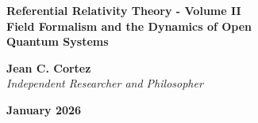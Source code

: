 \documentclass[10pt, a4paper]{article}
\begin{document}
\begin{titlepage}
    \vspace*{\fill}
    \begin{center}
        {\LARGE \textbf{Referential Relativity Theory - Volume II}} \\
        \vspace{0.6cm}
        {\Large \textbf{Field Formalism and the Dynamics of Open \\ Quantum Systems}} \\
        \vspace{2.5cm}
        
        {\large \textbf{Jean C. Cortez}} \\
        \textit{Independent Researcher and Philosopher} \\
        \vspace{1.2cm}
        
        \textbf{January 2026}
    \end{center}
    \vspace*{\fill}
\end{titlepage}

\newpage
\end{document}
